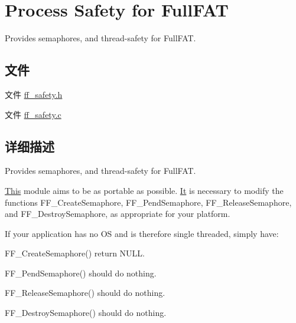 \hypertarget{group___s_a_f_e_t_y}{}\section{Process Safety for Full\+F\+AT}
\label{group___s_a_f_e_t_y}


Provides semaphores, and thread-\/safety for Full\+F\+AT.  


\subsection*{文件}
\begin{DoxyCompactItemize}
\item 
文件 \hyperlink{ff__safety_8h}{ff\+\_\+safety.\+h}
\item 
文件 \hyperlink{ff__safety_8c}{ff\+\_\+safety.\+c}
\end{DoxyCompactItemize}


\subsection{详细描述}
Provides semaphores, and thread-\/safety for Full\+F\+AT. 

\hyperlink{namespace_this}{This} module aims to be as portable as possible. \hyperlink{class_it}{It} is necessary to modify the functions F\+F\+\_\+\+Create\+Semaphore, F\+F\+\_\+\+Pend\+Semaphore, F\+F\+\_\+\+Release\+Semaphore, and F\+F\+\_\+\+Destroy\+Semaphore, as appropriate for your platform.

If your application has no OS and is therefore single threaded, simply have\+:

F\+F\+\_\+\+Create\+Semaphore() return N\+U\+LL.

F\+F\+\_\+\+Pend\+Semaphore() should do nothing.

F\+F\+\_\+\+Release\+Semaphore() should do nothing.

F\+F\+\_\+\+Destroy\+Semaphore() should do nothing. 